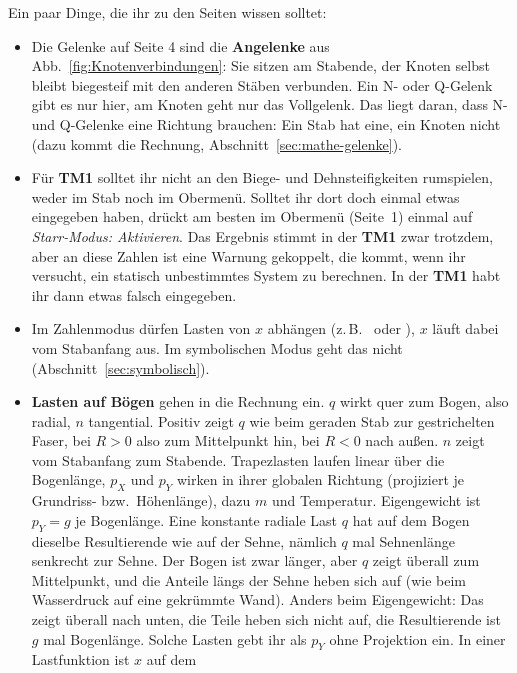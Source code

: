 Ein paar Dinge, die ihr zu den Seiten wissen solltet:

\begin{itemize}
  \item Die Gelenke auf Seite 4 sind die \textbf{Angelenke} aus Abb.~\ref{fig:Knotenverbindungen}:
        Sie sitzen am Stabende, der Knoten selbst bleibt biegesteif mit den anderen Stäben
        verbunden. Ein N- oder Q-Gelenk gibt es nur hier, am Knoten geht nur das Vollgelenk. Das liegt daran,
        dass N- und Q-Gelenke eine Richtung brauchen: Ein Stab hat eine, ein Knoten nicht (dazu
        kommt die Rechnung, Abschnitt~\ref{sec:mathe-gelenke}).
  \item Für \textbf{TM1} solltet ihr nicht an den Biege- und Dehnsteifigkeiten rumspielen, weder im Stab noch im Obermenü.
        Solltet ihr dort doch einmal etwas eingegeben haben, drückt am besten im Obermenü (Seite~1) einmal auf \emph{Starr-Modus: Aktivieren}.
        Das Ergebnis stimmt in der \textbf{TM1} zwar trotzdem, aber an diese Zahlen ist eine Warnung gekoppelt, die kommt, wenn ihr versucht, 
        ein statisch unbestimmtes System zu berechnen. In der \textbf{TM1} habt ihr dann etwas falsch eingegeben.
  \item Im Zahlenmodus dürfen Lasten von $x$ abhängen (z.\,B.\  oder ),
        $x$ läuft dabei vom Stabanfang aus. Im symbolischen Modus geht das nicht
        (Abschnitt~\ref{sec:symbolisch}).
  \item \textbf{Lasten auf Bögen} gehen in die Rechnung ein. $q$ wirkt quer zum Bogen, also
        radial, $n$ tangential. Positiv zeigt $q$ wie beim geraden Stab zur gestrichelten Faser,
        bei $R > 0$ also zum Mittelpunkt hin, bei $R < 0$ nach außen. $n$ zeigt vom Stabanfang zum
        Stabende. Trapezlasten laufen linear über die Bogenlänge, $p_X$ und $p_Y$
        wirken in ihrer globalen Richtung (projiziert je Grundriss- bzw.\ Höhenlänge), dazu $m$ und
        Temperatur. Eigengewicht ist $p_Y = g$ je Bogenlänge. Eine konstante radiale Last $q$ hat
        auf dem Bogen dieselbe Resultierende wie auf der Sehne, nämlich $q$ mal Sehnenlänge
        senkrecht zur Sehne. Der Bogen ist zwar länger, aber $q$ zeigt überall zum Mittelpunkt, und
        die Anteile längs der Sehne heben sich auf (wie beim Wasserdruck auf eine gekrümmte Wand).
        Anders beim Eigengewicht: Das zeigt überall nach unten, die Teile heben sich nicht auf, die
        Resultierende ist $g$ mal Bogenlänge. Solche Lasten gebt ihr als $p_Y$ ohne Projektion ein. In
        einer Lastfunktion ist $x$ auf dem

\end{itemize}
